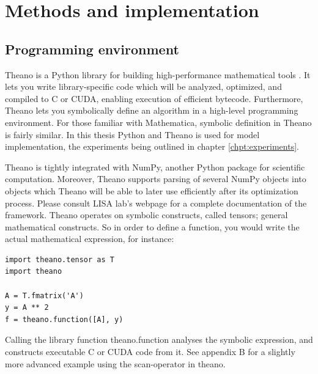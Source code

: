
\chapter{Methods and implementation}\label{chpt:methods}

\section{Programming environment}

Theano is a Python library for building high-performance mathematical tools \citep{Bergstra2010}. It lets you write library-specific code which will be analyzed, optimized, and compiled to C or CUDA, enabling execution of efficient bytecode. Furthermore, Theano lets you symbolically define an algorithm in a high-level programming environment. For those familiar with Mathematica, symbolic definition in Theano is fairly similar. In this thesis Python and Theano is used for model implementation, the experiments being outlined in chapter \ref{chpt:experiments}.

Theano is tightly integrated with NumPy, another Python package for scientific computation. Moreover, Theano supports parsing of several NumPy objects into objects which Theano will be able to later use efficiently after its optimization process. Please consult LISA lab's webpage \citep{LISA-lab2015a} for a complete documentation of the framework.
Theano operates on symbolic constructs, called tensors; general mathematical constructs. So in order to define a function, you would write the actual mathematical expression, for instance:

\begin{verbatim}
import theano.tensor as T
import theano

A = T.fmatrix('A')
y = A ** 2
f = theano.function([A], y)
\end{verbatim}

Calling the library function theano.function analyses the symbolic expression, and constructs executable C or CUDA code from it. See appendix B for a slightly more advanced example using the scan-operator in theano.

